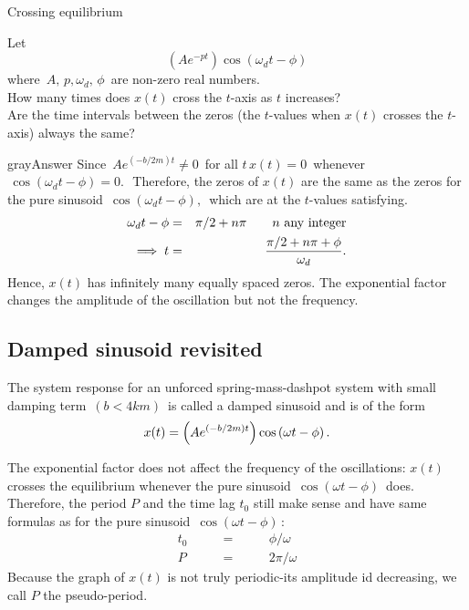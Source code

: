 \begin{exercise}
  Crossing equilibrium
\end{exercise}
Let
\begin{equation*}
  \displaystyle  \left(A e^{-pt}\right) \cos \left(\omega _ d t -\phi \right)
\end{equation*}
where $\,  A,\, p, \omega _ d ,\, \phi \,$ are non-zero real numbers.\\
How many times does $x(t)$ cross the $t$-axis as $t$ increases?\\
Are the time intervals between the zeros (the $t$-values when $x(t)$ crosses the $t$-axis)
always the same?
\begin{mybox}{gray}{Answer}
  Since $\, A e^{(-b/2m)t} \neq 0 \,$ for all $t\, x(t)=0\,$ whenever $\, \cos (\omega _ d t - \phi )=0.\, \,$
  Therefore, the zeros of $x(t)$ are the same as the zeros for the pure sinusoid
  $\, \cos (\omega _ d t - \phi ),\,$ which are at the $t$-values satisfying.
  \begin{eqnarray*}
    \displaystyle  \displaystyle \omega _ d t -\phi
    &\displaystyle =& \displaystyle  \pi /2 + n\pi \qquad n \text { any integer} \\
    \displaystyle \implies t &\displaystyle =& \displaystyle  \frac{\pi /2 + n\pi + \phi }{\omega _ d}.
  \end{eqnarray*}
  Hence, $x(t)$ has infinitely many equally spaced zeros.
  The exponential factor changes the amplitude of the oscillation but not the frequency.
\end{mybox}
\clearpage

\subsection{Damped sinusoid revisited}
The system response for an unforced spring-mass-dashpot system with small damping term
$\, (b<4km)\,$ is called a {\color{blue}damped sinusoid} and is of the form
\begin{equation*}
  \displaystyle  \displaystyle x(t) \displaystyle =
  \displaystyle  \left(A e^{(-b/2m)t}\right) \cos \left(\omega t -\phi \right).
\end{equation*}

The exponential factor does not affect the frequency of the oscillations:
$x(t)$ crosses the equilibrium whenever the pure sinusoid $\, \cos \left(\omega t -\phi \right)\,$
does.\\

Therefore, the period $P$ and the time lag $t_0$ still make sense and have same formulas as
for the pure sinusoid $\, \cos \left(\omega t -\phi \right)\, :$
\begin{eqnarray*}
  t_0 \qquad &=& \qquad \phi / \omega\\
  P \qquad &=& \qquad 2 \pi / \omega
\end{eqnarray*}
Because the graph of $x(t)$ is not truly periodic-its amplitude id decreasing, we call $P$
the {\color{blue}pseudo-period}.\\

